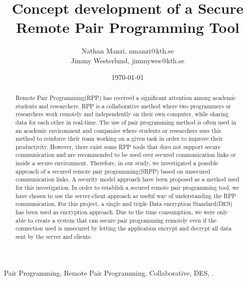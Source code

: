 \documentclass[journal,a4paper]{IEEEtran}
\begin{document}
\title{Concept development of a Secure Remote Pair Programming Tool}
\author{Nathan Manzi, nmanzi@kth.se \\ Jimmy Westerlund, jimmywes@kth.se}
\date{\today}
\maketitle
\begin{abstract}
Remote Pair Programming(RPP) has received a significant attention among academic students and researchers. RPP is a collaborative method where two programmers or researchers work remotely and independently on their own computer, while sharing data for each other in real-time. The use of pair programming method is often used in an academic environment and companies where students or researchers uses this method to reinforce their team working on a given task in order to improve their productivity. However, there  exist some RPP tools that does not support secure communication and are recommended to be used over secured communication links or inside a secure environment. Therefore, in our study, we investigated a possible approach of a secured remote pair programming(SRPP) based on unsecured communication links. A security model approach have been proposed as a method used for this investigation. In order to establish a secured remote pair programming tool,  we have chosen  to use the server-client approach as useful way of understanding the RPP communication. For this project, a single and triple  Data encryption Standard(DES) has been used as encryption approach. Due to the time consumption, we were only able to create a system that can secure pair programming remotely even if the connection used is unsecured by letting the application encrypt and decrypt all data sent by the server and clients.
\end{abstract}

\begin{IEEEkeywords}
Pair Programming, Remote Pair Programming, Collaborative, DES, .
\end{IEEEkeywords}












\end{document}
